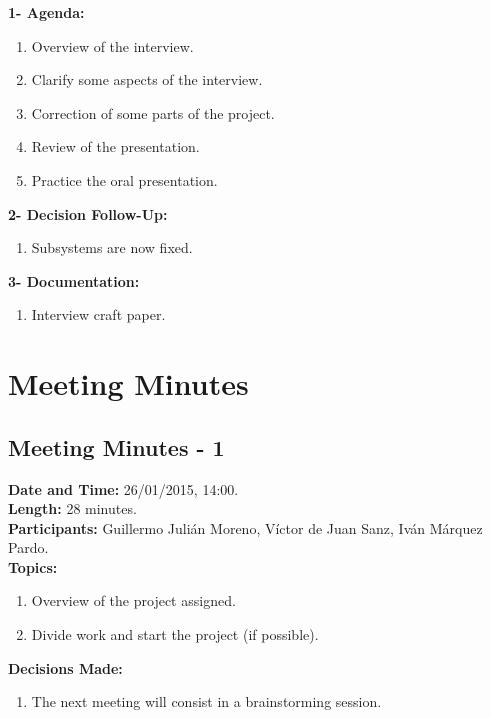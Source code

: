 \textbf{1- Agenda:}
\begin{enumerate}
\item Overview of the interview.
\item Clarify some aspects of the interview.
\item Correction of some parts of the project.
\item Review of the presentation.
\item Practice the oral presentation.
\end{enumerate}
\textbf{2- Decision Follow-Up:} 
\begin{enumerate}
\item Subsystems are now fixed.
\end{enumerate}
\textbf{3- Documentation:}
\begin{enumerate}
\item Interview craft paper.
\end{enumerate}


\section{Meeting Minutes}



\subsection{Meeting Minutes - 1}
\textbf{Date and Time:} 26/01/2015, 14:00. \\
\textbf{Length:} 28 minutes. \\
\textbf{Participants: } Guillermo Julián Moreno, Víctor de Juan Sanz, Iván Márquez Pardo.\\

\textbf{Topics: } 
\begin{enumerate}
\item Overview of the project assigned.
\item Divide work and start the project (if possible).
\end{enumerate}

\textbf{Decisions Made:}\\
\begin{enumerate}
\item The next meeting will consist in a brainstorming session.
\end{enumerate}

